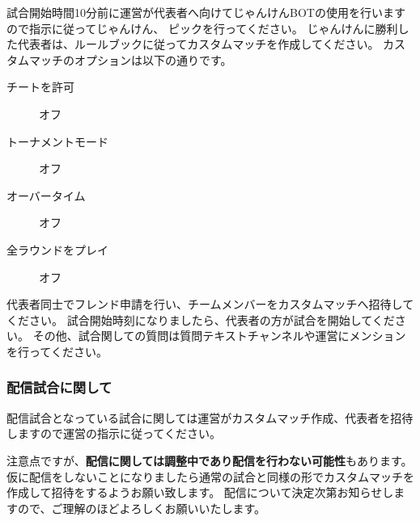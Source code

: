 \documentclass[uplatex,dvipdfmx]{jsarticle}
\begin{document}
	        試合開始時間10分前に運営が代表者へ向けてじゃんけんBOTの使用を行いますので指示に従ってじゃんけん、
	        ピックを行ってください。
	        じゃんけんに勝利した代表者は、ルールブックに従ってカスタムマッチを作成してください。
	        カスタムマッチのオプションは以下の通りです。
	        \begin{description}
	            \item[チートを許可] オフ
	            \item[トーナメントモード] オフ
	            \item[オーバータイム] オフ
	            \item[全ラウンドをプレイ] オフ
	        \end{description}
	        代表者同士でフレンド申請を行い、チームメンバーをカスタムマッチへ招待してください。
	        試合開始時刻になりましたら、代表者の方が試合を開始してください。
	        その他、試合関しての質問は質問テキストチャンネルや運営にメンションを行ってください。

	    \subsubsection{配信試合に関して}
	        配信試合となっている試合に関しては運営がカスタムマッチ作成、代表者を招待しますので運営の指示に従ってください。

	        注意点ですが、{\bf 配信に関しては調整中であり配信を行わない可能性}もあります。
	        仮に配信をしないことになりましたら通常の試合と同様の形でカスタムマッチを作成して招待をするようお願い致します。
	        配信について決定次第お知らせしますので、ご理解のほどよろしくお願いいたします。
\end{document}
